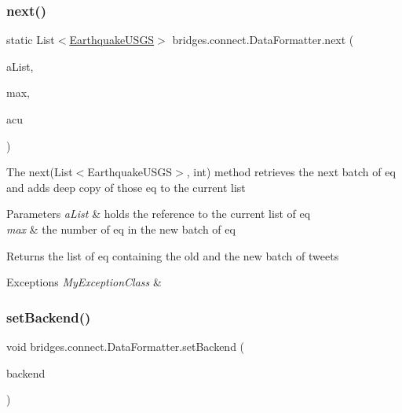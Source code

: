 \subsubsection{\texorpdfstring{next()}{next()}\hspace{0.1cm}{\footnotesize\ttfamily [2/2]}}
{\footnotesize\ttfamily static List$<$\mbox{\hyperlink{classbridges_1_1data__src__dependent_1_1_earthquake_u_s_g_s}{Earthquake\+U\+S\+GS}}$>$ bridges.\+connect.\+Data\+Formatter.\+next (\begin{DoxyParamCaption}\item[{List$<$ \mbox{\hyperlink{classbridges_1_1data__src__dependent_1_1_earthquake_u_s_g_s}{Earthquake\+U\+S\+GS}} $>$}]{a\+List,  }\item[{int}]{max,  }\item[{\mbox{\hyperlink{classbridges_1_1data__src__dependent_1_1_u_s_g_saccount}{U\+S\+G\+Saccount}}}]{acu }\end{DoxyParamCaption})\hspace{0.3cm}{\ttfamily [static]}}

The next(\+List$<$\+Earthquake\+U\+S\+G\+S$>$, int) method retrieves the next batch of eq and adds deep copy of those eq to the current list 
\begin{DoxyParams}{Parameters}
{\em a\+List} & holds the reference to the current list of eq \\
\hline
{\em max} & the number of eq in the new batch of eq \\
\hline
\end{DoxyParams}
\begin{DoxyReturn}{Returns}
the list of eq containing the old and the new batch of tweets 
\end{DoxyReturn}

\begin{DoxyExceptions}{Exceptions}
{\em My\+Exception\+Class} & \\
\hline
\end{DoxyExceptions}
\mbox{\label{classbridges_1_1connect_1_1_data_formatter_af9b878e5c092234a6ab5f8c11bee1fbd}} 
\subsubsection{\texorpdfstring{set\+Backend()}{setBackend()}}
{\footnotesize\ttfamily void bridges.\+connect.\+Data\+Formatter.\+set\+Backend (\begin{DoxyParamCaption}\item[{\mbox{\hyperlink{classbridges_1_1connect_1_1_connector}{Connector}}}]{backend }\end{DoxyParamCaption})\hspace{0.3cm}{\ttfamily [protected]}}


